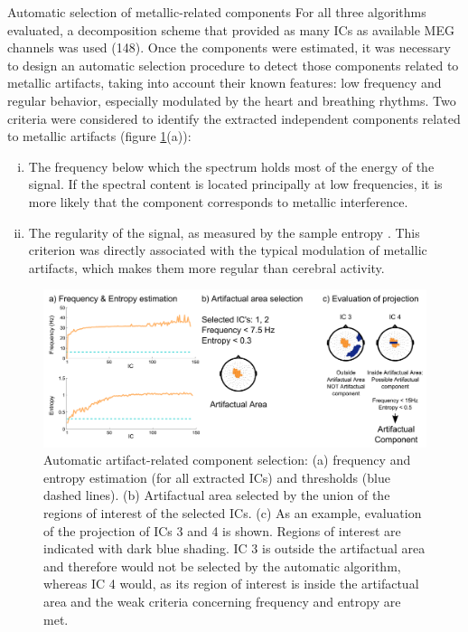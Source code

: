 Automatic selection of metallic-related components
For all three algorithms evaluated, a decomposition scheme that provided as many ICs as available MEG channels was used (148). Once the components were estimated, it was necessary to design an automatic selection procedure to detect those components related to metallic artifacts, taking into account their known features: low frequency and regular behavior, especially modulated by the heart and breathing rhythms. Two criteria were considered to identify the extracted independent components related to metallic artifacts (figure \ref{fig:1-2}(a)):

\begin{enumerate}[(i)]
\item The frequency below which the spectrum holds most of the energy of the signal. If the spectral content is located principally at low frequencies, it is more likely that the component corresponds to metallic interference.

\item The regularity of the signal, as measured by the sample entropy \citep{Richman2000}. This criterion was directly associated with the typical modulation of metallic artifacts, which makes them more regular than cerebral activity.
\end{enumerate}

\begin{figure}[ht]
\centering
\includegraphics[width=1\textwidth]{Images/fig1-2.png}
\caption{Automatic artifact-related component selection: (a) frequency and entropy estimation (for all extracted ICs) and thresholds (blue dashed lines). (b) Artifactual area selected by the union of the regions of interest of the selected ICs. (c) As an example, evaluation of the projection of ICs 3 and 4 is shown. Regions of interest are indicated with dark blue shading. IC 3 is outside the artifactual area and therefore would not be selected by the automatic algorithm, whereas IC 4 would, as its region of interest is inside the artifactual area and the weak criteria concerning frequency and entropy are met.}
\label{fig:1-2}
\end{figure}      

